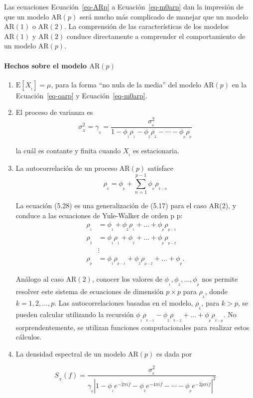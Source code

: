 \documentclass[
  us-letterpaper,
]{scrreprt}
\let\oldparagraph\paragraph
\renewcommand{\paragraph}[1]{\oldparagraph{#1}\mbox{}}
\theoremstyle{plain}
\theoremstyle{definition}
\theoremstyle{plain}
\theoremstyle{definition}
\theoremstyle{remark}
\begin{document}
Las ecuaciones Ecuación~\ref{eq-ARp} a Ecuación~\ref{eq-m0arp} dan la
impresión de que un modelo \(\mathrm{AR}(p)\) será mucho más complicado
de manejar que un modelo \(\mathrm{AR}(1)\) o \(\mathrm{AR}(2)\). La
comprensión de las características de los modelos \(\mathrm{AR}(1)\) y
\(\mathrm{AR}(2)\) conduce directamente a comprender el comportamiento
de un modelo \(\mathrm{AR}(p)\).

\paragraph{\texorpdfstring{Hechos sobre el modelo
\(\mathrm{AR}(p)\)}{Hechos sobre el modelo \textbackslash mathrm\{AR\}(p)}}\label{hechos-sobre-el-modelo-mathrmarp}

\begin{enumerate}
\def\labelenumi{\roman{enumi}.}
\item
  \(\mathrm{E}[X_{_t}]=\mu\), para la forma ``no nula de la media'' del
  modelo \(\mathrm{AR}(p)\) en la Ecuación~\ref{eq-oarp} y
  Ecuación~\ref{eq-m0arp}.
\item
  El proceso de varianza es
  \[\sigma_{_X}^2=\gamma_{_0}=\frac{\sigma_{_a}^2}{1-\phi_{_1}\rho_{_1}-\phi_{_2}\rho_{_2}-\cdots-\phi_{_p}\rho_{_p}}\]

  la cuál es contante y finita cuando \(X_{_t}\) es estacionaria.
\item
  La autocorrelación de un proceso \(\mathrm{AR}(p)\) satisface \[
  \rho_{_k}=\phi_{_p}+\sum_{n=1}^{p-1}\phi_{_n}\rho_{_{k-n}}
  \]

  La ecuación (5.28) es una generalización de (5.17) para el caso AR(2),
  y conduce a las ecuaciones de Yule-Walker de orden p p: \[
      \begin{split}
  \rho_{_{1}} &= \phi_{_1}+\phi_{_{2}} \rho_{_1} +\ldots + \phi_{_p} \rho_{_{p-1}} \\
  \rho_{_{2}} &= \phi_{_1}\rho_{_1}+\phi_{_{2}}  +\ldots + \phi_{_p} \rho_{_{p-2}}\\
  &\vdots \\
  \rho_{_{p}} &= \phi_{_1}\rho_{_{p-1}}+\phi_{_{2}} \rho_{_{p-2}} +\ldots + \phi_{_p}.
  \end{split}
    \]

  Análogo al caso \(\mathrm{AR}(2)\), conocer los valores de
  \(\phi_{_1}, \phi_{_2}, \ldots, \phi_{_p}\) nos permite resolver este
  sistema de ecuaciones de dimensión \(p\times p\) para \(\rho_{_k}\),
  donde \(k = 1, 2, \ldots, p\). Las autocorrelaciones basadas en el
  modelo, \(\rho_{_k}\), para \(k > p\), se pueden calcular utilizando
  la recursión
  \(\phi_{_1} \rho_{_{k-1}} - \phi_{_2} \rho_{_{k-2}} + \ldots + \phi_{_p} \rho_{_{k-p}}\).
  No sorprendentemente, se utilizan funciones computacionales para
  realizar estos cálculos.
\item
  La densidad espectral de un modelo \(\mathrm{AR}(p)\) es dada por

  \[
  S_{_X}(f)=\frac{\sigma_{_a}^2}{\gamma_{_0}|1-\phi_{_1}e^{-2\pi i f}-\phi_{_2}e^{-4\pi i f}-\cdots-\phi_{_p}e^{-2p\pi i f}|^2}
  \]
\end{enumerate}
\end{document}
